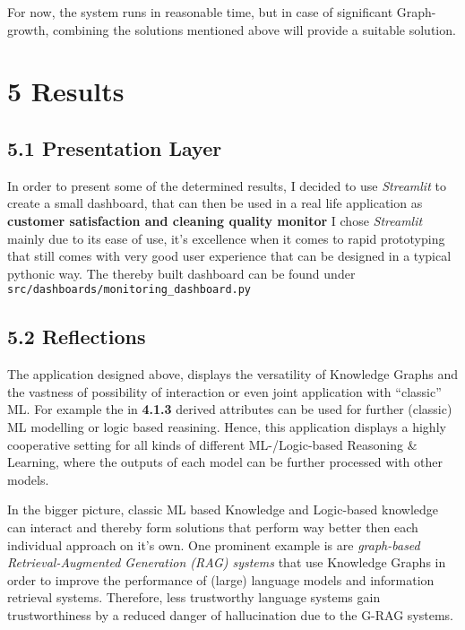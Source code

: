\documentclass[
]{article}
\begin{document}
For now, the system runs in reasonable time, but in case of significant
Graph-growth, combining the solutions mentioned above will provide a
suitable solution.

\section{5 Results}\label{results-1}

\subsection{5.1 Presentation Layer}\label{presentation-layer}

In order to present some of the determined results, I decided to use
\emph{Streamlit} to create a small dashboard, that can then be used in a
real life application as \textbf{customer satisfaction and cleaning
quality monitor} I chose \emph{Streamlit} mainly due to its ease of use,
it's excellence when it comes to rapid prototyping that still comes with
very good user experience that can be designed in a typical pythonic
way. The thereby built dashboard can be found under
\texttt{src/dashboards/monitoring\_dashboard.py}

\subsection{5.2 Reflections}\label{reflections}

The application designed above, displays the versatility of Knowledge
Graphs and the vastness of possibility of interaction or even joint
application with ``classic'' ML. For example the in \textbf{4.1.3}
derived attributes can be used for further (classic) ML modelling or
logic based reasining. Hence, this application displays a highly
cooperative setting for all kinds of different ML-/Logic-based Reasoning
\& Learning, where the outputs of each model can be further processed
with other models.

In the bigger picture, classic ML based Knowledge and Logic-based
knowledge can interact and thereby form solutions that perform way
better then each individual approach on it's own. One prominent example
is are \emph{graph-based Retrieval-Augmented Generation (RAG) systems}
that use Knowledge Graphs in order to improve the performance of (large)
language models and information retrieval systems. Therefore, less
trustworthy language systems gain trustworthiness by a reduced danger of
hallucination due to the G-RAG systems.
\end{document}
